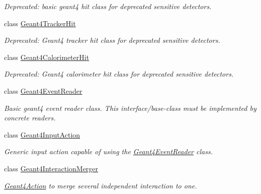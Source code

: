 \begin{DoxyCompactItemize}
\begin{DoxyCompactList}\small\item\em Deprecated: basic geant4 hit class for deprecated sensitive detectors. \item\end{DoxyCompactList}\item 
class \hyperlink{class_d_d4hep_1_1_simulation_1_1_geant4_tracker_hit}{Geant4TrackerHit}
\begin{DoxyCompactList}\small\item\em Deprecated: Geant4 tracker hit class for deprecated sensitive detectors. \item\end{DoxyCompactList}\item 
class \hyperlink{class_d_d4hep_1_1_simulation_1_1_geant4_calorimeter_hit}{Geant4CalorimeterHit}
\begin{DoxyCompactList}\small\item\em Deprecated: Geant4 calorimeter hit class for deprecated sensitive detectors. \item\end{DoxyCompactList}\item 
class \hyperlink{class_d_d4hep_1_1_simulation_1_1_geant4_event_reader}{Geant4EventReader}
\begin{DoxyCompactList}\small\item\em Basic geant4 event reader class. This interface/base-\/class must be implemented by concrete readers. \item\end{DoxyCompactList}\item 
class \hyperlink{class_d_d4hep_1_1_simulation_1_1_geant4_input_action}{Geant4InputAction}
\begin{DoxyCompactList}\small\item\em Generic input action capable of using the \hyperlink{class_d_d4hep_1_1_simulation_1_1_geant4_event_reader}{Geant4EventReader} class. \item\end{DoxyCompactList}\item 
class \hyperlink{class_d_d4hep_1_1_simulation_1_1_geant4_interaction_merger}{Geant4InteractionMerger}
\begin{DoxyCompactList}\small\item\em \hyperlink{class_d_d4hep_1_1_simulation_1_1_geant4_action}{Geant4Action} to merge several independent interaction to one. \item\end{DoxyCompactList}\item 

\end{DoxyCompactItemize}
